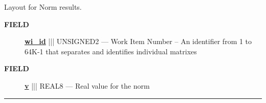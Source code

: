 \par





Layout for Norm results.







\par
\begin{description}
\item [\colorbox{tagtype}{\color{white} \textbf{\textsf{FIELD}}}] \textbf{\underline{wi\_id}} ||| UNSIGNED2 --- Work Item Number -- An identifier from 1 to 64K-1 that separates and identifies individual matrixes
\item [\colorbox{tagtype}{\color{white} \textbf{\textsf{FIELD}}}] \textbf{\underline{v}} ||| REAL8 --- Real value for the norm
\end{description}





\rule{\linewidth}{0.5pt}


